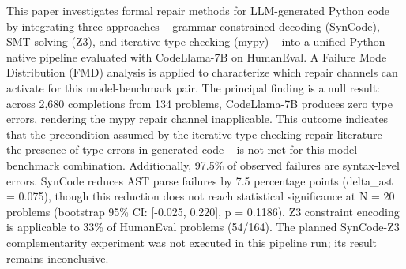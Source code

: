 
This paper investigates formal repair methods for LLM-generated Python code by integrating three approaches -- grammar-constrained decoding (SynCode), SMT solving (Z3), and iterative type checking (mypy) -- into a unified Python-native pipeline evaluated with CodeLlama-7B on HumanEval. A Failure Mode Distribution (FMD) analysis is applied to characterize which repair channels can activate for this model-benchmark pair. The principal finding is a null result: across 2,680 completions from 134 problems, CodeLlama-7B produces zero type errors, rendering the mypy repair channel inapplicable. This outcome indicates that the precondition assumed by the iterative type-checking repair literature -- the presence of type errors in generated code -- is not met for this model-benchmark combination. Additionally, 97.5\% of observed failures are syntax-level errors. SynCode reduces AST parse failures by 7.5 percentage points (delta_ast = 0.075), though this reduction does not reach statistical significance at N = 20 problems (bootstrap 95\% CI: [-0.025, 0.220], p = 0.1186). Z3 constraint encoding is applicable to 33\% of HumanEval problems (54/164). The planned SynCode-Z3 complementarity experiment was not executed in this pipeline run; its result remains inconclusive.
